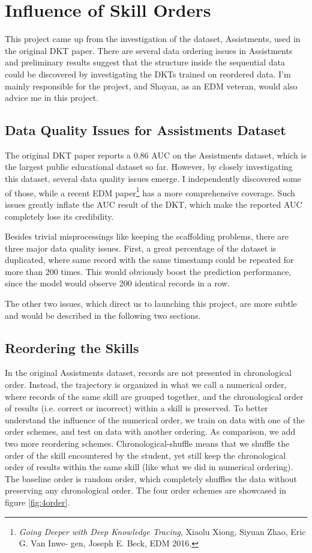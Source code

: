 \section{Influence of Skill Orders}
\label{sec:influence}

This project came up from the investigation of the dataset, Assistments, used in the original DKT paper. There are several data ordering issues in Assistments and preliminary results suggest that the structure inside the sequential data could be discovered by investigating the DKTs trained on reordered data. I'm mainly responsible for the project, and Shayan, as an EDM veteran, would also advice me in this project.

\subsection{Data Quality Issues for Assistments Dataset}

The original DKT paper reports a 0.86 AUC on the Assistments dataset, which is the largest public educational dataset so far. However, by closely investigating this dataset, several data quality issues emerge. I independently discovered some of those, while a recent EDM paper\footnote{\textit{Going Deeper with Deep Knowledge Tracing}, Xiaolu Xiong, Siyuan Zhao, Eric G. Van Inwe- gen, Joseph E. Beck, EDM 2016.} has a more comprehensive coverage. Such issues greatly inflate the AUC result of the DKT, which make the reported AUC completely lose its credibility.

Besides trivial misprocessings like keeping the scaffolding problems, there are three major data quality issues. First, a great percentage of the dataset is duplicated, where same record with the same timestamp could be repeated for more than 200 times. This would obviously boost the prediction performance, since the model would observe 200 identical records in a row.

The other two issues, which direct us to launching this project, are more subtle and would be described in the following two sections. 

\subsection{Reordering the Skills}

In the original Assistments dataset, records are not presented in chronological order. Instead, the trajectory is organized in what we call a numerical order, where records of the same skill are grouped together, and the chronological order of results (i.e. correct or incorrect) within a skill is preserved. To better understand the influence of the numerical order, we train on data with one of the order schemes, and test on data with another ordering. As comparison, we add two more reordering schemes. Chronological-shuffle means that we shuffle the order of the skill encountered by the student, yet still keep the chronological order of results within the same skill (like what we did in numerical ordering). The baseline order is random order, which completely shuffles the data without preserving any chronological order. The four order schemes are showcased in figure \ref{fig:4order}.

